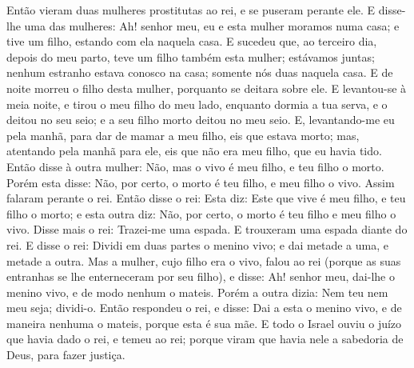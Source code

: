Então vieram duas mulheres prostitutas ao rei, e se puseram
perante ele. E disse-lhe uma das mulheres: Ah! senhor meu, eu
e esta mulher moramos numa casa; e tive um filho, estando com ela
naquela casa. E sucedeu que, ao terceiro dia, depois do meu
parto, teve um filho também esta mulher; estávamos juntas; nenhum
estranho estava conosco na casa; somente nós duas naquela casa.
E de noite morreu o filho desta mulher, porquanto se deitara
sobre ele. E levantou-se à meia noite, e tirou o meu filho do
meu lado, enquanto dormia a tua serva, e o deitou no seu seio; e a
seu filho morto deitou no meu seio. E, levantando-me eu pela
manhã, para dar de mamar a meu filho, eis que estava morto; mas,
atentando pela manhã para ele, eis que não era meu filho, que eu
havia tido. Então disse à outra mulher: Não, mas o vivo é meu
filho, e teu filho o morto. Porém esta disse: Não, por certo, o
morto é teu filho, e meu filho o vivo. Assim falaram perante o rei.
Então disse o rei: Esta diz: Este que vive é meu filho, e teu
filho o morto; e esta outra diz: Não, por certo, o morto é teu filho
e meu filho o vivo. Disse mais o rei: Trazei-me uma espada. E
trouxeram uma espada diante do rei. E disse o rei: Dividi em
duas partes o menino vivo; e dai metade a uma, e metade a outra.
Mas a mulher, cujo filho era o vivo, falou ao rei (porque as
suas entranhas se lhe enterneceram por seu filho), e disse: Ah!
senhor meu, dai-lhe o menino vivo, e de modo nenhum o mateis. Porém
a outra dizia: Nem teu nem meu seja; dividi-o. Então
respondeu o rei, e disse: Dai a esta o menino vivo, e de maneira
nenhuma o mateis, porque esta é sua mãe. E todo o Israel
ouviu o juízo que havia dado o rei, e temeu ao rei; porque viram que
havia nele a sabedoria de Deus, para fazer justiça.

\medskip

